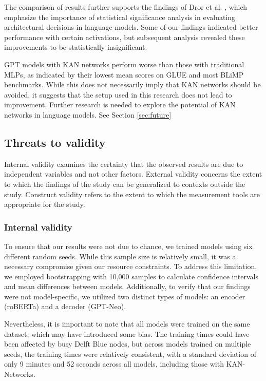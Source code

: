 The comparison of results further supports the findings of Dror et al. \cite{dror2018hitchhikers}, which emphasize the importance of statistical significance analysis in evaluating architectural decisions in language models. Some of our findings indicated better performance with certain activations, but subsequent analysis revealed these improvements to be statistically insignificant.

GPT models with KAN networks perform worse than those with traditional MLPs, as indicated by their lowest mean scores on GLUE and most BLiMP benchmarks. While this does not necessarily imply that KAN networks should be avoided, it suggests that the setup used in this research does not lead to improvement. Further research is needed to explore the potential of KAN networks in language models. See Section \ref{sec:future}

\subsection{Threats to validity}
Internal validity examines the certainty that the observed results are due to independent variables and not other factors. External validity concerns the extent to which the findings of the study can be generalized to contexts outside the study. Construct validity refers to the extent to which the measurement tools are appropriate for the study. 

\subsubsection{Internal validity}
\label{sec:internal}
To ensure that our results were not due to chance, we trained models using six different random seeds. While this sample size is relatively small, it was a necessary compromise given our resource constraints. To address this limitation, we employed bootstrapping with 10,000 samples to calculate confidence intervals and mean differences between models. Additionally, to verify that our findings were not model-specific, we utilized two distinct types of models: an encoder (roBERTa) and a decoder (GPT-Neo).

Nevertheless, it is important to note that all models were trained on the same dataset, which may have introduced some bias. The training times could have been affected by busy Delft Blue nodes, but across models trained on multiple seeds, the training times were relatively consistent, with a standard deviation of only 9 minutes and 52 seconds across all models, including those with KAN-Networks.

